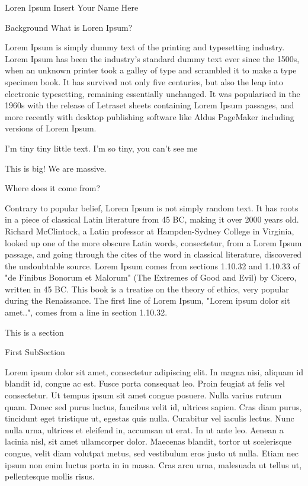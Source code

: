 
Loren Ipsum %
Insert Your Name Here %


Background %
What is Loren Ipsum? %

Lorem Ipsum is simply dummy text of the printing and typesetting industry. 
Lorem Ipsum has been the industry's standard dummy text ever since the 1500s, 
when an unknown printer took a galley of type and scrambled it to make a type 
specimen book. It has survived not only five centuries, but also the leap into 
electronic typesetting, remaining essentially unchanged. It was popularised in 
the 1960s with the release of Letraset sheets containing Lorem Ipsum passages, 
and more recently with desktop publishing software like Aldus PageMaker 
including versions of Lorem Ipsum.

I'm tiny tiny little text. I'm so tiny, you can't see me

This is big! We are massive.

Where does it come from?  %

Contrary to popular belief, Lorem Ipsum is not simply random text. It has roots 
in a piece of classical Latin literature from 45 BC, making it over 2000 years 
old. Richard McClintock, a Latin professor at Hampden-Sydney College in 
Virginia, looked up one of the more obscure Latin words, consectetur, from a 
Lorem Ipsum passage, and going through the cites of the word in classical 
literature, discovered the undoubtable source. Lorem Ipsum comes from sections 
1.10.32 and 1.10.33 of "de Finibus Bonorum et Malorum" (The Extremes of Good 
and Evil) by Cicero, written in 45 BC. This book is a treatise on the theory of 
ethics, very popular during the Renaissance. The first line of Lorem Ipsum, 
"Lorem ipsum dolor sit amet..", comes from a line in section 1.10.32.

This is a section %

First SubSection %

Lorem ipsum dolor sit amet, consectetur adipiscing elit. In magna nisi, aliquam 
id blandit id, congue ac est. Fusce porta consequat leo. Proin feugiat at felis 
vel consectetur. Ut tempus ipsum sit amet congue posuere. Nulla varius rutrum 
quam. Donec sed purus luctus, faucibus velit id, ultrices sapien. Cras diam 
purus, tincidunt eget tristique ut, egestas quis nulla. Curabitur vel iaculis 
lectus. Nunc nulla urna, ultrices et eleifend in, accumsan ut erat. In ut ante 
leo. Aenean a lacinia nisl, sit amet ullamcorper dolor. Maecenas blandit, 
tortor ut scelerisque congue, velit diam volutpat metus, sed vestibulum eros 
justo ut nulla. Etiam nec ipsum non enim luctus porta in in massa. Cras arcu 
urna, malesuada ut tellus ut, pellentesque mollis risus.

